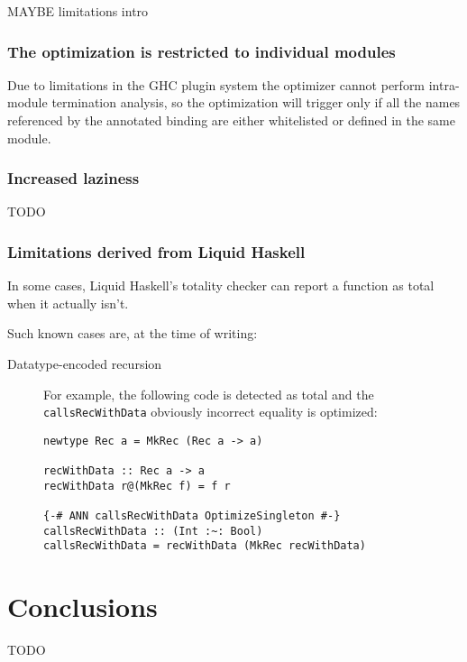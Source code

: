 MAYBE limitations intro

\subsection{The optimization is restricted to individual modules}
\label{subsec:single-module}

Due to limitations in the GHC plugin system the optimizer cannot perform intra-module termination analysis, so the optimization will trigger only if all the names referenced by the annotated binding are either whitelisted or defined in the same module.

\subsection{Increased laziness}
\label{subsec:limitations-laziness}

TODO

\subsection{Limitations derived from Liquid Haskell}
\label{subsec:limitations-lh}

In some cases, Liquid Haskell's totality checker can report a function as total when it actually isn't.

Such known cases are, at the time of writing:

\begin{description}
  \item[Datatype-encoded recursion]
    For example, the following code is detected as total and the \texttt{callsRecWithData} obviously incorrect equality is optimized:
    \begin{lstlisting}
newtype Rec a = MkRec (Rec a -> a)

recWithData :: Rec a -> a
recWithData r@(MkRec f) = f r

{-# ANN callsRecWithData OptimizeSingleton #-}
callsRecWithData :: (Int :~: Bool)
callsRecWithData = recWithData (MkRec recWithData)
    \end{lstlisting}
\end{description}

\chapter{Conclusions}
\label{cha:conclusions}

TODO

